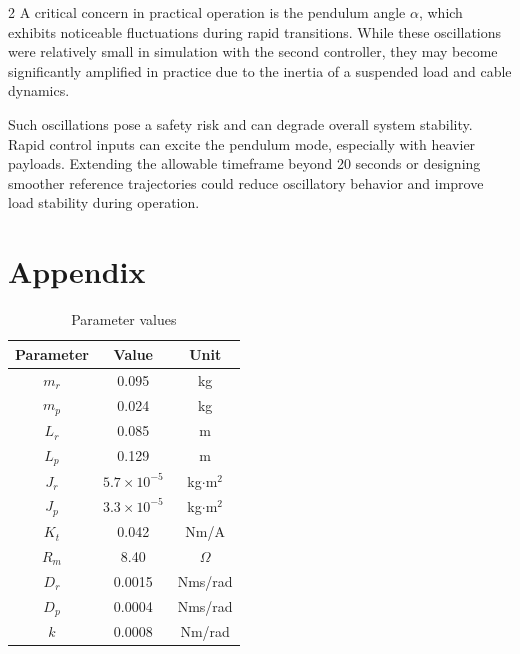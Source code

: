 \documentclass[12pt]{article}
\begin{document}
\begin{multicols}{2}
A critical concern in practical operation is the pendulum angle \( \alpha \), which exhibits noticeable fluctuations during rapid transitions. While these oscillations were relatively small in simulation with the second controller, they may become significantly amplified in practice due to the inertia of a suspended load and cable dynamics.

Such oscillations pose a safety risk and can degrade overall system stability. Rapid control inputs can excite the pendulum mode, especially with heavier payloads. Extending the allowable timeframe beyond 20 seconds or designing smoother reference trajectories could reduce oscillatory behavior and improve load stability during operation.


\end{multicols}












\newpage




\section{Appendix}

\begin{table}[H]
\centering
\caption{Parameter values}
\begin{tabular}{|c|c|c|}
\hline
\textbf{Parameter} & \textbf{Value} & \textbf{Unit} \\
\hline
$m_r$ & 0.095 & kg \\
$m_p$ & 0.024 & kg \\
$L_r$ & 0.085 & m \\
$L_p$ & 0.129 & m \\
$J_r$ & $5.7 \times 10^{-5}$ & kg$\cdot$m$^2$ \\
$J_p$ & $3.3 \times 10^{-5}$ & kg$\cdot$m$^2$ \\
$K_t$ & 0.042 & Nm/A \\
$R_m$ & 8.40 & $\Omega$ \\
$D_r$ & 0.0015 & Nms/rad \\
$D_p$ & 0.0004 & Nms/rad \\
$k$ & 0.0008 & Nm/rad \\
\hline
\end{tabular}
\label{tab:params}
\end{table}
\end{document}
